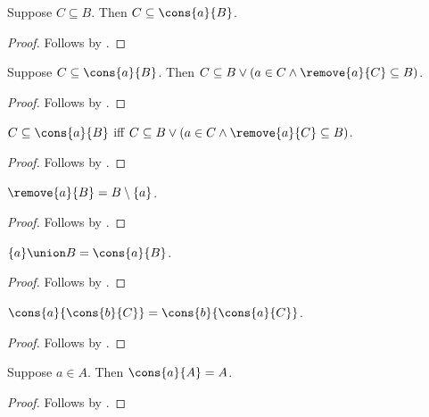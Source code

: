 \begin{proposition}\label{subseteq_cons_intro_right}
    Suppose $C \subseteq B$.
    Then $C\subseteq \cons{a}{B}$.
\end{proposition}
\begin{proof}
    Follows by .
\end{proof}

\begin{proposition}\label{subseteq_cons_elim}
    Suppose $C\subseteq \cons{a}{B}$.
    Then $C\subseteq B \lor (a\in C \land \remove{a}{C} \subseteq B)$.
\end{proposition}
\begin{proof}
    Follows by .
\end{proof}

\begin{proposition}\label{subseteq_cons_iff}
    $C\subseteq \cons{a}{B}$ iff $C\subseteq B \lor (a\in C \land \remove{a}{C}\subseteq B)$.
\end{proposition}
\begin{proof}
    Follows by .
\end{proof}


\begin{proposition}\label{remove_point_eq_setminus_singleton}
    $\remove{a}{B} = B\setminus\{a\}$.
\end{proposition}
\begin{proof}
    Follows by .
\end{proof}


\begin{proposition}\label{union_eq_cons}
    $\{a\}\union B = \cons{a}{B}$.
\end{proposition}
\begin{proof}
    Follows by .
\end{proof}

\begin{proposition}\label{cons_comm}
    $\cons{a}{\cons{b}{C}} = \cons{b}{\cons{a}{C}}$.
\end{proposition}
\begin{proof}
    Follows by .
\end{proof}

\begin{proposition}\label{cons_absorb}
    Suppose $a\in A$.
    Then $\cons{a}{A} = A$.
\end{proposition}
\begin{proof}
    Follows by .
\end{proof}

